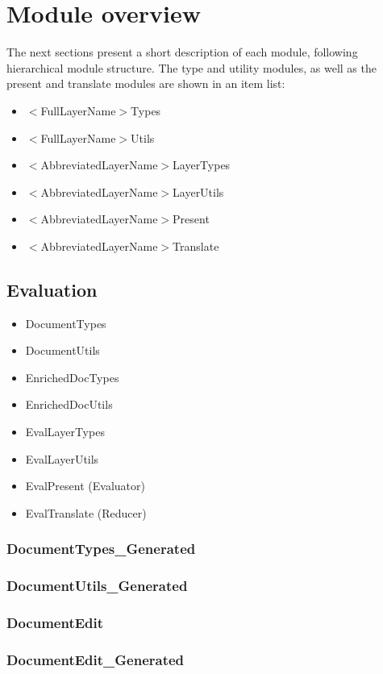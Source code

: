 \documentclass[]{article}
\begin{document}
\section{Module overview}

The next sections present a short description of each module, following hierarchical module structure. The type and utility modules, as well as the present and translate modules are shown in an item list:

\begin{itemize}
\item $<$FullLayerName$>$Types
\item $<$FullLayerName$>$Utils
\item $<$AbbreviatedLayerName$>$LayerTypes
\item $<$AbbreviatedLayerName$>$LayerUtils
\item $<$AbbreviatedLayerName$>$Present
\item $<$AbbreviatedLayerName$>$Translate
\end{itemize}

\subsection{Evaluation}
\begin{itemize}
\item DocumentTypes
\item DocumentUtils
\item EnrichedDocTypes
\item EnrichedDocUtils
\item EvalLayerTypes
\item EvalLayerUtils
\item EvalPresent  (Evaluator)
\item EvalTranslate (Reducer)
\end{itemize}
\subsubsection{DocumentTypes\_Generated}
\subsubsection{DocumentUtils\_Generated}

\subsubsection{DocumentEdit}

\subsubsection{DocumentEdit\_Generated}
\end{document}
